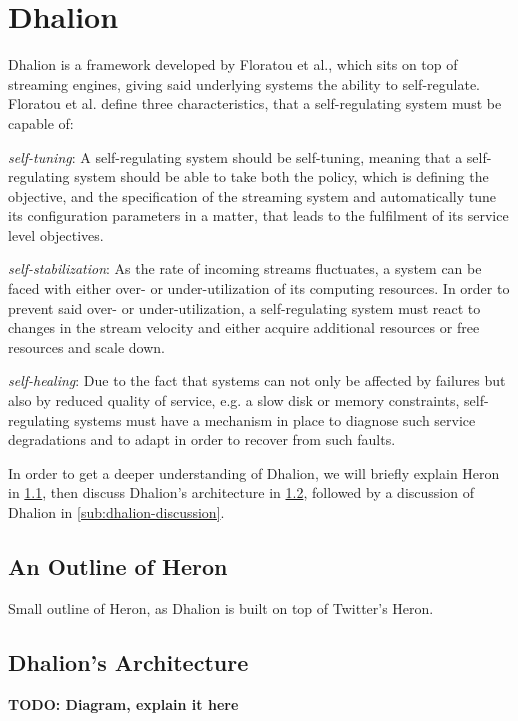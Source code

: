     \section{Dhalion}
    \label{sec:dhalion}
    Dhalion is a framework developed by Floratou et al., which sits on top of streaming engines, giving said underlying systems the ability to self-regulate.  
    Floratou et al. define three characteristics, that a self-regulating system must be capable of:
    
    \quad \textit{self-tuning}: A self-regulating system should be self-tuning, meaning that a self-regulating system should 
    be able to take both the policy, which is defining the objective, and the specification of the streaming system and automatically tune 
    its configuration parameters in a matter, that leads to the fulfilment of its service level objectives.
    
    \quad \textit{self-stabilization}: As the rate of incoming streams fluctuates, a system can be faced with either over- or under-utilization of its computing resources. 
    In order to prevent said over- or under-utilization, a self-regulating system must react to changes in the stream velocity and either acquire additional resources 
    or free resources and scale down.

    \quad \textit{self-healing}: Due to the fact that systems can not only be affected by failures but also by reduced quality of service, 
    e.g. a slow disk or memory constraints, self-regulating systems must have a mechanism in place to diagnose such service degradations and to adapt 
    in order to recover from such faults.

    In order to get a deeper understanding of Dhalion, we will briefly explain Heron in \ref{sub:heron-outline}, then discuss Dhalion's architecture in \ref{sub:dhalion-architecture}, 
    followed by a discussion of Dhalion in \ref{sub:dhalion-discussion}.

        \subsection{An Outline of Heron}
        \label{sub:heron-outline}
        Small outline of Heron, as Dhalion is built on top of Twitter's Heron.

        \subsection{Dhalion's Architecture}
        \label{sub:dhalion-architecture}
        \textbf{TODO: Diagram, explain it here}
        
